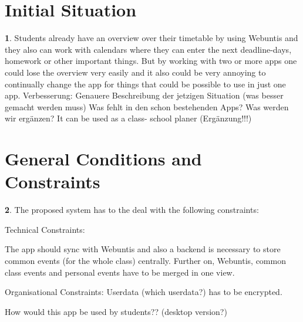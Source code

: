 \documentclass[12pt]{article}
\theoremstyle{definition}
\newtheorem{ourVersion}{ \linebreak}
\begin{document}
\section{Initial Situation}

\begin{ourVersion}
Students already have an overview over their timetable by using Webuntis and they also can work with calendars where they can enter the next deadline-days, homework or other important things.
But by working with two or more apps one could lose the overview very easily and it also could be very annoying to continually change the app for things that could be possible to use in just one app. \linebreak \linebreak
Verbesserung: \linebreak
Genauere Beschreibung der jetzigen Situation (was besser gemacht werden muss) \linebreak
Was fehlt in den schon bestehenden Apps? Was werden wir ergänzen? \linebreak
It can be used as a class- school planer (Ergänzung!!!) 
\end{ourVersion}
\pagebreak

\section{General Conditions and Constraints}

\begin{ourVersion}
The proposed system has to the deal with the following constraints: \linebreak

Technical Constraints: \linebreak

The app should sync with Webuntis and also a
backend is necessary to store common events (for the whole class) centrally.
Further on, Webuntis, common class events and personal events have to be merged in one view. \linebreak

Organisational Constraints: \linebreak
Userdata (which userdata?) has to be encrypted. \linebreak

How would this app be used by students?? (desktop version?)

\end{ourVersion}

\pagebreak
\end{document}
